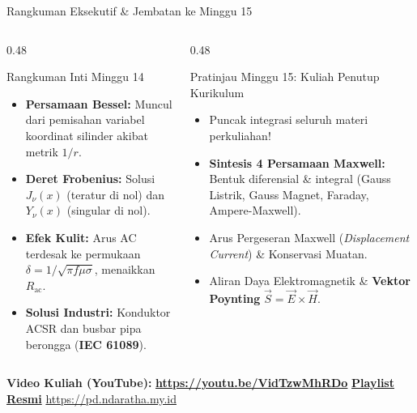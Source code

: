 \documentclass[aspectratio=169,10pt]{beamer}
\begin{document}
\begin{frame}{Rangkuman Eksekutif \& Jembatan ke Minggu 15}
  \begin{columns}[t]
    \begin{column}{0.48\textwidth}
      \begin{block}{Rangkuman Inti Minggu 14}
        \begin{itemize}
          \item \textbf{Persamaan Bessel:} Muncul dari pemisahan variabel koordinat silinder akibat metrik $1/r$.
          \item \textbf{Deret Frobenius:} Solusi $J_\nu(x)$ (teratur di nol) dan $Y_\nu(x)$ (singular di nol).
          \item \textbf{Efek Kulit:} Arus AC terdesak ke permukaan $\delta = 1/\sqrt{\pi f \mu \sigma}$, menaikkan $R_{\text{ac}}$.
          \item \textbf{Solusi Industri:} Konduktor ACSR dan busbar pipa berongga (\textbf{IEC 61089}).
        \end{itemize}
      \end{block}
    \end{column}
    \begin{column}{0.48\textwidth}
      \begin{alertblock}{Pratinjau Minggu 15: Kuliah Penutup Kurikulum}
        \begin{itemize}
          \item Puncak integrasi seluruh materi perkuliahan!
          \item \textbf{Sintesis 4 Persamaan Maxwell:} Bentuk diferensial \& integral (Gauss Listrik, Gauss Magnet, Faraday, Ampere-Maxwell).
          \item Arus Pergeseran Maxwell (\textit{Displacement Current}) \& Konservasi Muatan.
          \item Aliran Daya Elektromagnetik \& \textbf{Vektor Poynting} $\vec{S} = \vec{E} \times \vec{H}$.
        \end{itemize}
      \end{alertblock}
    \end{column}
  \end{columns}
  \vspace{0.06cm}
  \begin{center}
    \scriptsize \textbf{Video Kuliah (YouTube):} {\color{red!80!black}\textbf{\url{https://youtu.be/VidTzwMhRDo}}} \quad \textbar \quad \href{https://www.youtube.com/playlist?list=PLS5oOZWXZeTw}{\color{unibblue}\textbf{Playlist Resmi}} \quad \textbar \quad \url{https://pd.ndaratha.my.id}
  \end{center}
\end{frame}
\end{document}
